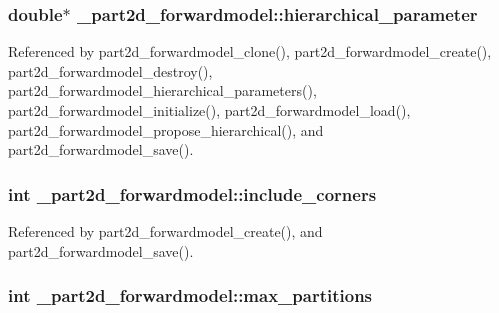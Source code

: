\subsubsection[{\texorpdfstring{hierarchical\+\_\+parameter}{hierarchical_parameter}}]{\setlength{\rightskip}{0pt plus 5cm}double$\ast$ \+\_\+part2d\+\_\+forwardmodel\+::hierarchical\+\_\+parameter}\hypertarget{struct__part2d__forwardmodel_a3a3eac35072ac9cc0caa29e62f9935fe}{}\label{struct__part2d__forwardmodel_a3a3eac35072ac9cc0caa29e62f9935fe}


Referenced by part2d\+\_\+forwardmodel\+\_\+clone(), part2d\+\_\+forwardmodel\+\_\+create(), part2d\+\_\+forwardmodel\+\_\+destroy(), part2d\+\_\+forwardmodel\+\_\+hierarchical\+\_\+parameters(), part2d\+\_\+forwardmodel\+\_\+initialize(), part2d\+\_\+forwardmodel\+\_\+load(), part2d\+\_\+forwardmodel\+\_\+propose\+\_\+hierarchical(), and part2d\+\_\+forwardmodel\+\_\+save().

\subsubsection[{\texorpdfstring{include\+\_\+corners}{include_corners}}]{\setlength{\rightskip}{0pt plus 5cm}int \+\_\+part2d\+\_\+forwardmodel\+::include\+\_\+corners}\hypertarget{struct__part2d__forwardmodel_a024ddffa3beae9186dfa395ca141ee54}{}\label{struct__part2d__forwardmodel_a024ddffa3beae9186dfa395ca141ee54}


Referenced by part2d\+\_\+forwardmodel\+\_\+create(), and part2d\+\_\+forwardmodel\+\_\+save().

\subsubsection[{\texorpdfstring{max\+\_\+partitions}{max_partitions}}]{\setlength{\rightskip}{0pt plus 5cm}int \+\_\+part2d\+\_\+forwardmodel\+::max\+\_\+partitions}\hypertarget{struct__part2d__forwardmodel_a6953c8f443d7eb5403c707f5f01d72dd}{}\label{struct__part2d__forwardmodel_a6953c8f443d7eb5403c707f5f01d72dd}


